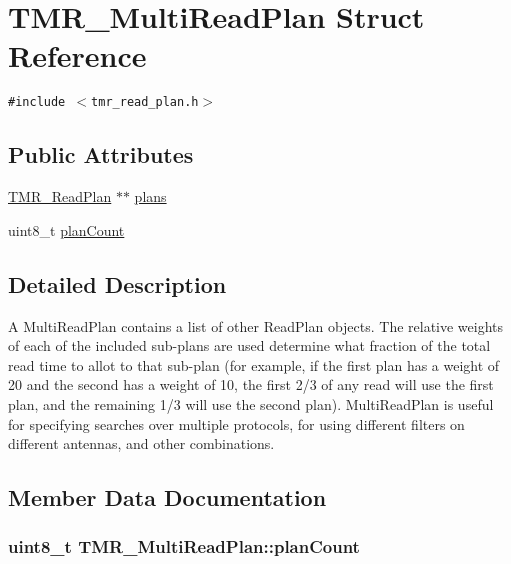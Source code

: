 \hypertarget{struct_t_m_r___multi_read_plan}{
\section{TMR\_\-MultiReadPlan Struct Reference}
\label{struct_t_m_r___multi_read_plan}
}
{\tt \#include $<$tmr\_\-read\_\-plan.h$>$}

\subsection*{Public Attributes}
\begin{CompactItemize}
\item 
\hyperlink{struct_t_m_r___read_plan}{TMR\_\-ReadPlan} $\ast$$\ast$ \hyperlink{struct_t_m_r___multi_read_plan_5286a1547275c8206ec2bbf82118acea}{plans}
\item 
uint8\_\-t \hyperlink{struct_t_m_r___multi_read_plan_50bf0ed5b5690437568f3ff4ce7fc632}{planCount}
\end{CompactItemize}


\subsection{Detailed Description}
A MultiReadPlan contains a list of other ReadPlan objects. The relative weights of each of the included sub-plans are used determine what fraction of the total read time to allot to that sub-plan (for example, if the first plan has a weight of 20 and the second has a weight of 10, the first 2/3 of any read will use the first plan, and the remaining 1/3 will use the second plan). MultiReadPlan is useful for specifying searches over multiple protocols, for using different filters on different antennas, and other combinations. 

\subsection{Member Data Documentation}
\hypertarget{struct_t_m_r___multi_read_plan_50bf0ed5b5690437568f3ff4ce7fc632}{
\subsubsection[{planCount}]{\setlength{\rightskip}{0pt plus 5cm}uint8\_\-t {\bf TMR\_\-MultiReadPlan::planCount}}}
\label{struct_t_m_r___multi_read_plan_50bf0ed5b5690437568f3ff4ce7fc632}


